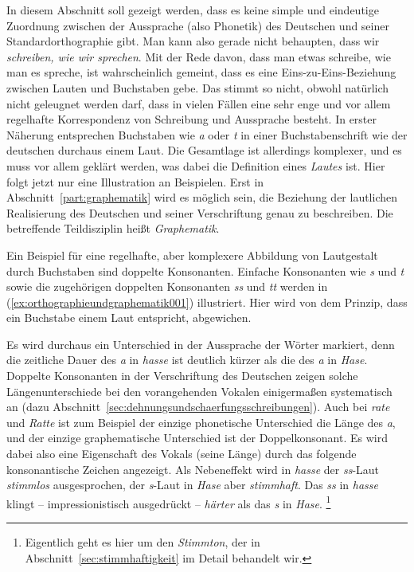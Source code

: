
In diesem Abschnitt soll gezeigt werden, dass es keine simple und eindeutige Zuordnung zwischen der Aussprache (also Phonetik) des Deutschen und seiner Standardorthographie gibt.
Man kann also gerade nicht behaupten, dass wir \textit{schreiben, wie wir sprechen}.
Mit der Rede davon, dass man etwas schreibe, wie man es spreche, ist wahrscheinlich gemeint, dass es eine Eins-zu-Eins-Beziehung zwischen Lauten und Buchstaben gebe.
Das stimmt so nicht, obwohl natürlich nicht geleugnet werden darf, dass in vielen Fällen eine sehr enge und vor allem regelhafte Korrespondenz von Schreibung und Aussprache besteht.
In erster Näherung entsprechen Buchstaben wie \textit{a} oder \textit{t} in einer Buchstabenschrift wie der deutschen durchaus einem Laut.
Die Gesamtlage ist allerdings komplexer, und es muss vor allem geklärt werden, was dabei die Definition eines \textit{Lautes} ist.
Hier folgt jetzt nur eine Illustration an Beispielen.
Erst in Abschnitt~\ref{part:graphematik} wird es möglich sein, die Beziehung der lautlichen Realisierung des Deutschen und seiner Verschriftung genau zu beschreiben.
Die betreffende Teildisziplin heißt \textit{Graphematik}.

Ein Beispiel für eine regelhafte, aber komplexere Abbildung von Lautgestalt durch Buchstaben sind doppelte Konsonanten.
Einfache Konsonanten wie \textit{s} und \textit{t} sowie die zugehörigen doppelten Konsonanten \textit{ss} und \textit{tt} werden in (\ref{ex:orthographieundgraphematik001}) illustriert.
Hier wird von dem Prinzip, dass ein Buchstabe einem Laut entspricht, abgewichen.

\begin{exe}
  \ex\label{ex:orthographieundgraphematik001}
  \begin{xlist}
  \end{xlist}
\end{exe}

Es wird durchaus ein Unterschied in der Aussprache der Wörter markiert, denn die zeitliche Dauer des \textit{a} in \textit{hasse} ist deutlich kürzer als die des \textit{a} in \textit{Hase}.
Doppelte Konsonanten in der Verschriftung des Deutschen zeigen solche Längenunterschiede bei den vorangehenden Vokalen einigermaßen systematisch an (dazu Abschnitt~\ref{sec:dehnungsundschaerfungsschreibungen}).
Auch bei \textit{rate} und \textit{Ratte} ist zum Beispiel der einzige phonetische Unterschied die Länge des \textit{a}, und der einzige graphematische Unterschied ist der Doppelkonsonant.
Es wird dabei also eine Eigenschaft des Vokals (seine Länge) durch das folgende konsonantische Zeichen angezeigt.
Als Nebeneffekt wird in \textit{hasse} der \textit{ss}-Laut \textit{stimmlos} ausgesprochen, der \textit{s}-Laut in \textit{Hase} aber \textit{stimmhaft}.
Das \textit{ss} in \textit{hasse} klingt -- impressionistisch ausgedrückt -- \textit{härter} als das \textit{s} in \textit{Hase}.%
\footnote{Eigentlich geht es hier um den \textit{Stimmton}, der in Abschnitt~\ref{sec:stimmhaftigkeit} im Detail behandelt wir.}

